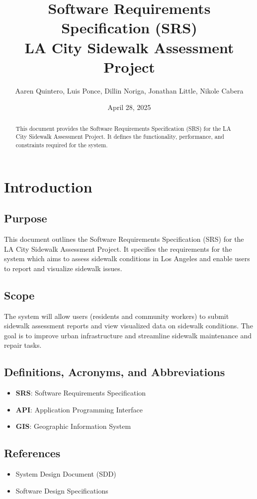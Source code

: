 \documentclass[a4paper,12pt]{article}
\title{Software Requirements Specification (SRS)\\LA City Sidewalk Assessment Project}
\author{Aaren Quintero, Luis Ponce, Dillin Noriga, Jonathan Little, Nikole Cabera}
\date{April 28, 2025}
\begin{document}
\maketitle

\begin{abstract}
This document provides the Software Requirements Specification (SRS) for the LA City Sidewalk Assessment Project. It defines the functionality, performance, and constraints required for the system.
\end{abstract}

\tableofcontents
\newpage

\section{Introduction}

\subsection{Purpose}
This document outlines the Software Requirements Specification (SRS) for the LA City Sidewalk Assessment Project. It specifies the requirements for the system which aims to assess sidewalk conditions in Los Angeles and enable users to report and visualize sidewalk issues.

\subsection{Scope}
The system will allow users (residents and community workers) to submit sidewalk assessment reports and view visualized data on sidewalk conditions. The goal is to improve urban infrastructure and streamline sidewalk maintenance and repair tasks.

\subsection{Definitions, Acronyms, and Abbreviations}
\begin{itemize}
    \item \textbf{SRS}: Software Requirements Specification
    \item \textbf{API}: Application Programming Interface
    \item \textbf{GIS}: Geographic Information System
\end{itemize}

\subsection{References}
\begin{itemize}
    \item System Design Document (SDD)
    \item Software Design Specifications
\end{itemize}
\end{document}
